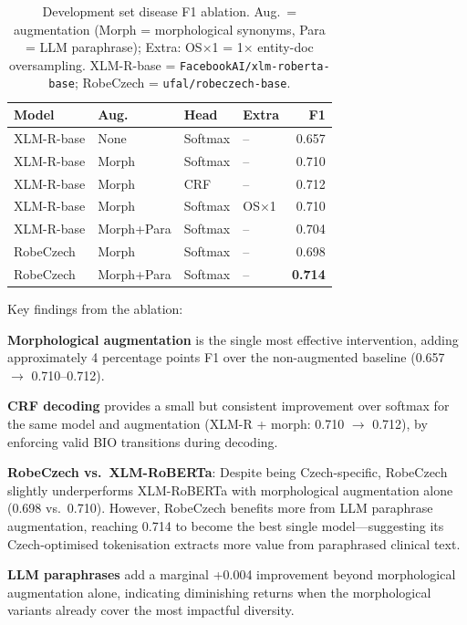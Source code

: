 \documentclass[11pt]{article}
\begin{document}
\begin{table}[h]
\centering
\small
\begin{tabular}{llllr}
\toprule
\textbf{Model} & \textbf{Aug.} & \textbf{Head} & \textbf{Extra} & \textbf{F1} \\
\midrule
XLM-R-base & None    & Softmax & {--}         & 0.657 \\
XLM-R-base & Morph   & Softmax & {--}         & 0.710 \\
XLM-R-base & Morph   & CRF     & {--}         & 0.712 \\
XLM-R-base & Morph   & Softmax & OS$\times$1 & 0.710 \\
XLM-R-base & Morph+Para & Softmax & {--}      & 0.704 \\
RobeCzech  & Morph   & Softmax & {--}         & 0.698 \\
RobeCzech  & Morph+Para & Softmax & {--}      & \textbf{0.714} \\
\bottomrule
\end{tabular}
\caption{Development set disease F1 ablation. Aug.\ = augmentation (Morph = morphological
synonyms, Para = LLM paraphrase); Extra: OS$\times$1 = 1$\times$ entity-doc oversampling.
XLM-R-base = \texttt{FacebookAI/xlm-roberta-base}; RobeCzech = \texttt{ufal/robeczech-base}.}
\label{tab:ablation}
\end{table}

Key findings from the ablation:

\textbf{Morphological augmentation} is the single most effective intervention, adding
approximately 4 percentage points F1 over the non-augmented baseline (0.657 $\to$ 0.710--0.712).

\textbf{CRF decoding} provides a small but consistent improvement over softmax for the
same model and augmentation (XLM-R + morph: 0.710 $\to$ 0.712), by enforcing valid
BIO transitions during decoding.

\textbf{RobeCzech vs.\ XLM-RoBERTa}: Despite being Czech-specific, RobeCzech
slightly underperforms XLM-RoBERTa with morphological augmentation alone (0.698 vs.\ 0.710).
However, RobeCzech benefits more from LLM paraphrase augmentation, reaching
0.714 to become the best single model---suggesting its Czech-optimised tokenisation
extracts more value from paraphrased clinical text.

\textbf{LLM paraphrases} add a marginal +0.004 improvement beyond morphological augmentation
alone, indicating diminishing returns when the morphological variants already cover
the most impactful diversity.
\end{document}
